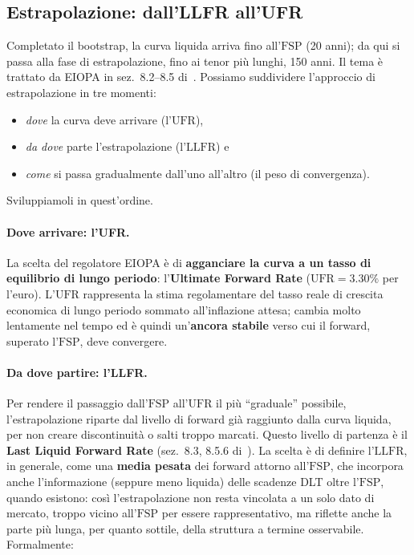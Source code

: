 \documentclass[11pt,a4paper]{article}
\theoremstyle{plain}
\theoremstyle{definition}
\theoremstyle{remark}
\newcommand{\UFR}{\mathrm{UFR}}
\newcommand{\LLFR}{\mathrm{LLFR}}
\newcommand{\FSP}{\mathrm{FSP}}
\begin{document}
\subsection{Estrapolazione: dall'LLFR all'UFR}
\label{sec:estrapolazione}

Completato il bootstrap, la curva liquida arriva fino all'$\FSP$ (20 anni); da qui si passa alla
fase di estrapolazione, fino ai tenor più lunghi, 150 anni. Il tema è trattato da EIOPA in
sez.~8.2--8.5 di~\cite{eiopa2026}.
Possiamo suddividere l'approccio di estrapolazione in tre momenti: \begin{itemize}
  \item \emph{dove} la curva deve arrivare (l'$\UFR$),
  \item \emph{da dove} parte l'estrapolazione (l'$\LLFR$) e
  \item \emph{come} si passa gradualmente dall'uno all'altro (il peso di convergenza).
\end{itemize}
Sviluppiamoli in quest'ordine.

\paragraph{Dove arrivare: l'UFR.}
La scelta del regolatore EIOPA \`e di \textbf{agganciare
la curva a un tasso di equilibrio di lungo periodo}: l'\textbf{Ultimate Forward Rate}
($\UFR = 3.30\%$ per l'euro). L'$\UFR$ rappresenta la
stima regolamentare del tasso reale di crescita economica di lungo periodo sommato
all'inflazione attesa; cambia molto lentamente nel tempo ed \`e quindi un'\textbf{ancora
stabile} verso cui il forward, superato l'$\FSP$, deve convergere.

\paragraph{Da dove partire: l'LLFR.}
Per rendere il passaggio dall'$\FSP$ all'$\UFR$ il più ``graduale'' possibile, l'estrapolazione
riparte dal livello di forward gi\`a raggiunto dalla curva liquida, per non creare
discontinuit\`a o salti troppo marcati.
Questo livello di partenza \`e il \textbf{Last Liquid Forward Rate} (sez.~8.3,
8.5.6 di~\cite{eiopa2026}). La scelta è di definire l'$\LLFR$, in generale, come una
\textbf{media pesata} dei forward attorno all'$\FSP$, che incorpora anche l'informazione
(seppure meno liquida) delle scadenze DLT oltre l'$\FSP$, quando esistono: cos\`i l'estrapolazione
non resta vincolata a un solo dato di mercato, troppo vicino all'$\FSP$ per essere
rappresentativo, ma riflette anche la parte pi\`u lunga, per quanto
sottile, della struttura a termine osservabile. Formalmente:
\end{document}
